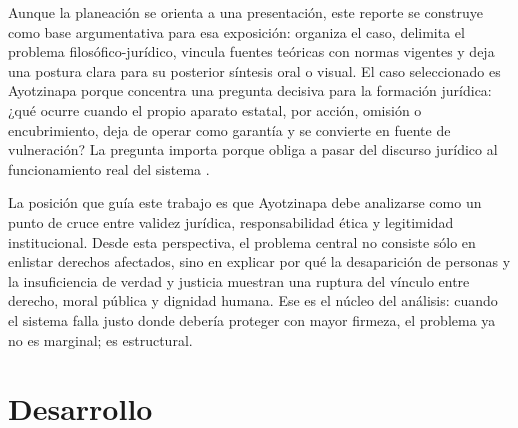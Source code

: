 \documentclass[
	spanish,
	letterpaper, oneside
]{article}
\begin{document}
Aunque la planeación se orienta a una presentación, este reporte se construye como base argumentativa para esa exposición: organiza el caso, delimita el problema filosófico-jurídico, vincula fuentes teóricas con normas vigentes y deja una postura clara para su posterior síntesis oral o visual. El caso seleccionado es Ayotzinapa porque concentra una pregunta decisiva para la formación jurídica: ¿qué ocurre cuando el propio aparato estatal, por acción, omisión o encubrimiento, deja de operar como garantía y se convierte en fuente de vulneración? La pregunta importa porque obliga a pasar del discurso jurídico al funcionamiento real del sistema \citep{cpeum2026,casoAyotzinapaCNDH2024}.

La posición que guía este trabajo es que Ayotzinapa debe analizarse como un punto de cruce entre validez jurídica, responsabilidad ética y legitimidad institucional. Desde esta perspectiva, el problema central no consiste sólo en enlistar derechos afectados, sino en explicar por qué la desaparición de personas y la insuficiencia de verdad y justicia muestran una ruptura del vínculo entre derecho, moral pública y dignidad humana. Ese es el núcleo del análisis: cuando el sistema falla justo donde debería proteger con mayor firmeza, el problema ya no es marginal; es estructural.

%
%
\section{Desarrollo}
\end{document}
